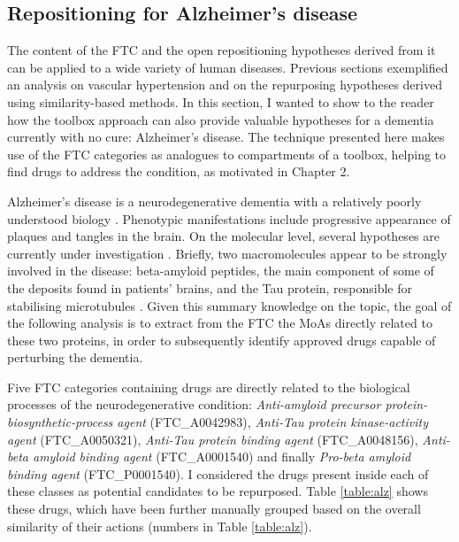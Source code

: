 \subsection{Repositioning for Alzheimer's disease}
The content of the FTC and the open repositioning hypotheses derived from it can be applied to a wide variety of human diseases. Previous sections exemplified an analysis on vascular hypertension and on the repurposing hypotheses derived using similarity-based methods. In this section, I wanted to show to the reader how the toolbox approach can also provide valuable hypotheses for a dementia currently with no cure: Alzheimer's disease. The technique presented here makes use of the FTC categories as analogues to compartments of a toolbox, helping to find drugs to address the condition, as motivated in Chapter 2.

Alzheimer's disease is a neurodegenerative dementia with a relatively poorly understood biology \citep{mckhann2011diagnosis}. Phenotypic manifestations include progressive appearance of plaques and tangles in the brain. On the molecular level, several hypotheses are currently under investigation \citep{mckhann2011diagnosis}. Briefly, two macromolecules appear to be strongly involved in the disease: beta-amyloid peptides, the main component of some of the deposits found in patients' brains, and the Tau protein, responsible for stabilising microtubules \citep{scheuner1996secreted} \citep{delacourte1986alzheimer}. Given this summary knowledge on the topic, the goal of the following analysis is to extract from the FTC the MoAs directly related to these two proteins, in order to subsequently identify approved drugs capable of perturbing the dementia.

Five FTC categories containing drugs are directly related to the biological processes of the neurodegenerative condition: \emph{Anti-amyloid precursor protein-biosynthetic-process agent} (FTC\_A0042983), \emph{Anti-Tau protein kinase-activity agent} (FTC\_A0050321), \emph{Anti-Tau protein binding agent} (FTC\_A0048156), \emph{Anti-beta amyloid binding agent} (FTC\_A0001540) and finally \emph{Pro-beta amyloid binding agent} (FTC\_P0001540). I considered the drugs present inside each of these classes as potential candidates to be repurposed. Table \ref{table:alz} shows these drugs, which have been further manually grouped based on the overall similarity of their actions (numbers in Table \ref{table:alz}).


